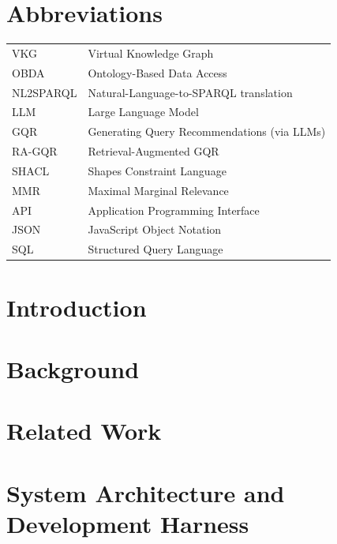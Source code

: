 \documentclass[a4paper,11pt]{report}
\begin{document}
\tableofcontents
\listoffigures
\listoftables

\chapter*{Abbreviations}

\begin{tabular}{ll}
VKG      & Virtual Knowledge Graph \\
OBDA     & Ontology-Based Data Access \\
NL2SPARQL & Natural-Language-to-SPARQL translation \\
LLM      & Large Language Model \\
GQR      & Generating Query Recommendations (via LLMs) \\
RA-GQR   & Retrieval-Augmented GQR \\
SHACL    & Shapes Constraint Language \\
MMR      & Maximal Marginal Relevance \\
API      & Application Programming Interface \\
JSON     & JavaScript Object Notation \\
SQL      & Structured Query Language \\
\end{tabular}

\chapter{Introduction}\label{ch:intro}
    

\chapter{Background}\label{ch:background}
    

\chapter{Related Work}\label{ch:relwork}
    

\chapter{System Architecture and Development Harness}\label{ch:arch}
    
\end{document}
